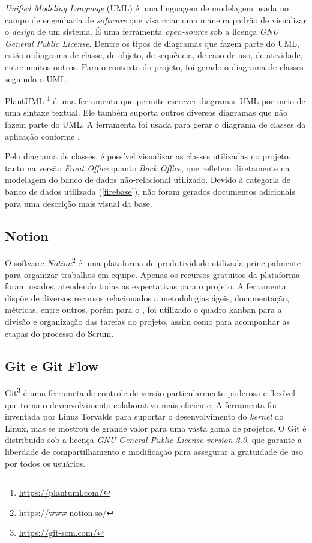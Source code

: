 \textit{Unified Modeling Language} (UML) \cite{uml} é uma linguagem de modelagem usada no campo de engenharia de \textit{software} que visa criar uma maneira padrão de visualizar o \textit{design} de um sistema.  É uma ferramenta \textit{open-source} sob a licença \textit{GNU General Public License}. Dentre os tipos de diagramas que fazem parte do UML, estão o diagrama de classe, de objeto, de sequência, de caso de uso, de atividade, entre muitos outros. Para o contexto do projeto, foi gerado o diagrama de classes seguindo o UML.

PlantUML \footnote{\url{https://plantuml.com/}} é uma ferramenta que permite escrever diagramas UML por meio de uma sintaxe textual. Ele também suporta outros diversos diagramas que não fazem parte do UML. A ferramenta foi usada para gerar o diagrama de classes da aplicação conforme .


Pelo diagrama de classes, é possível visualizar as classes utilizadas no projeto, tanto na versão \textit{Front Office} quanto \textit{Back Office}, que refletem diretamente na modelagem do banco de dados não-relacional utilizado. Devido à categoria de banco de dados utilizada (\ref{firebase}), não foram gerados documentos adicionais para uma descrição mais visual da base.

\subsection{Notion}
\label{notion}

O software \textit{Notion}\footnote{\url{https://www.notion.so/}} é uma plataforma de produtividade utilizada principalmente para organizar trabalhos em equipe. Apenas os recursos gratuitos da plataforma foram usados, atendendo todas as expectativas para o projeto. A ferramenta dispõe de diversos recursos relacionados a metodologias ágeis, documentação, métricas, entre outros, porém para o \appName, foi utilizado o quadro kanban para a divisão e organização das tarefas do projeto, assim como para acompanhar as etapas do processo do Scrum.

\subsection{Git e Git Flow}
\label{git}

Git\footnote{\url{https://git-scm.com/}} \cite{git} é uma ferrameta de controle de versão particularmente poderosa e flexível que torna o devenvolvimento colaborativo mais eficiente. A ferramenta foi inventada por Linus Torvalds para suportar o desenvolvimento do \textit{kernel} do Linux, mas se mostrou de grande valor para uma vasta gama de projetos. O Git é distribuído sob a licença \textit{GNU General Public License version 2.0}, que garante a liberdade de compartilhamento e modificação para assegurar a gratuidade de uso por todos os usuários.

